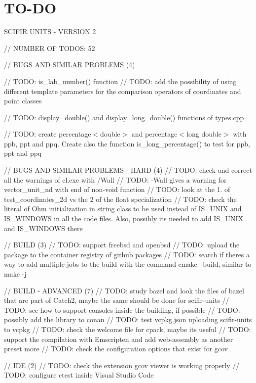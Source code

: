 \chapter{TO-\/\+DO}
\hypertarget{md_TO-DO}{}\label{md_TO-DO}
SCIFIR UNITS -\/ VERSION 2

// NUMBER OF TODOS\+: 52

// BUGS AND SIMILAR PROBLEMS (4)

// TODO\+: is\+\_\+lab\+\_\+number() function // TODO\+: add the possibility of using different template parameters for the comparison operators of coordinates and point classes

// TODO\+: display\+\_\+double() and display\+\_\+long\+\_\+double() functions of types.\+cpp

// TODO\+: create percentage$<$double$>$ and percentage$<$long double$>$ with ppb, ppt and ppq. Create also the function is\+\_\+long\+\_\+percentage() to test for ppb, ppt and ppq

// BUGS AND SIMILAR PROBLEMS -\/ HARD (4) // TODO\+: check and correct all the warnings of cl.\+exe with /\+Wall // TODO\+: -\/Wall gives a warning for vector\+\_\+unit\+\_\+nd with end of non-\/void function // TODO\+: look at the 1. of test\+\_\+coordinates\+\_\+2d vs the 2 of the float specialization // TODO\+: check the literal of Ohm initialization in string class to be used instead of IS\+\_\+\+UNIX and IS\+\_\+\+WINDOWS in all the code files. Also, possibly it\textquotesingle{}s needed to add IS\+\_\+\+UNIX and IS\+\_\+\+WINDOWS there

// BUILD (3) // TODO\+: support freebsd and openbsd // TODO\+: upload the package to the container registry of github packages // TODO\+: search if there\textquotesingle{}s a way to add multiple jobs to the build with the command cmake --build, similar to make -\/j

// BUILD -\/ ADVANCED (7) // TODO\+: study bazel and look the files of bazel that are part of Catch2, maybe the same should be done for scifir-\/units // TODO\+: see how to support consoles inside the building, if possible // TODO\+: possibly add the library to conan // TODO\+: test vcpkg.\+json uploading scifir-\/units to vcpkg // TODO\+: check the welcome file for cpack, maybe it\textquotesingle{}s useful // TODO\+: support the compilation with Emscripten and add web-\/assembly as another preset more // TODO\+: check the configuration options that exist for gcov

// IDE (2) // TODO\+: check the extension gcov viewer is working properly // TODO\+: configure ctest inside Visual Studio Code

